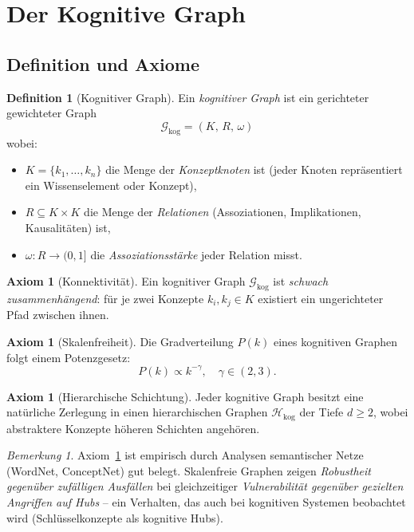 ﻿\documentclass[12pt,a4paper]{article}
\theoremstyle{plain}
\theoremstyle{definition}
\newtheorem{definition}[theorem]{Definition}
\newtheorem{axiom}[theorem]{Axiom}
\theoremstyle{remark}
\newtheorem{bemerkung}[theorem]{Bemerkung}
\newcommand{\GG}{\mathcal{G}}
\newcommand{\HH}{\mathcal{H}}
\begin{document}
\section{Der Kognitive Graph}
\label{sec:kognitivergraph}

\subsection{Definition und Axiome}

\begin{definition}[Kognitiver Graph]
\label{def:kognitiv}
Ein \emph{kognitiver Graph} ist ein gerichteter gewichteter Graph
\[
  \GG_{\text{kog}} = (K,\, R,\, \omega)
\]
wobei:
\begin{itemize}
  \item $K = \{k_1, \ldots, k_n\}$ die Menge der \emph{Konzeptknoten} ist (jeder Knoten repräsentiert ein Wissenselement oder Konzept),
  \item $R \subseteq K \times K$ die Menge der \emph{Relationen} (Assoziationen, Implikationen, Kausalitäten) ist,
  \item $\omega: R \to (0,1]$ die \emph{Assoziationsstärke} jeder Relation misst.
\end{itemize}
\end{definition}

\begin{axiom}[Konnektivität]
\label{ax:konnektivitaet}
Ein kognitiver Graph $\GG_{\text{kog}}$ ist \emph{schwach zusammenhängend}: für je zwei Konzepte $k_i, k_j \in K$ existiert ein ungerichteter Pfad zwischen ihnen.
\end{axiom}

\begin{axiom}[Skalenfreiheit]
\label{ax:skalenfrei}
Die Gradverteilung $P(k)$ eines kognitiven Graphen folgt einem Potenzgesetz:
\[
  P(k) \propto k^{-\gamma}, \quad \gamma \in (2, 3).
\]
\end{axiom}

\begin{axiom}[Hierarchische Schichtung]
\label{ax:hierarchie}
Jeder kognitive Graph besitzt eine natürliche Zerlegung in einen hierarchischen Graphen $\HH_{\text{kog}}$ der Tiefe $d \geq 2$, wobei abstraktere Konzepte höheren Schichten angehören.
\end{axiom}

\begin{bemerkung}
Axiom~\ref{ax:skalenfrei} ist empirisch durch Analysen semantischer Netze (WordNet, ConceptNet) gut belegt. Skalenfreie Graphen zeigen \emph{Robustheit gegenüber zufälligen Ausfällen} bei gleichzeitiger \emph{Vulnerabilität gegenüber gezielten Angriffen auf Hubs} -- ein Verhalten, das auch bei kognitiven Systemen beobachtet wird (Schlüsselkonzepte als kognitive Hubs).
\end{bemerkung}
\end{document}
